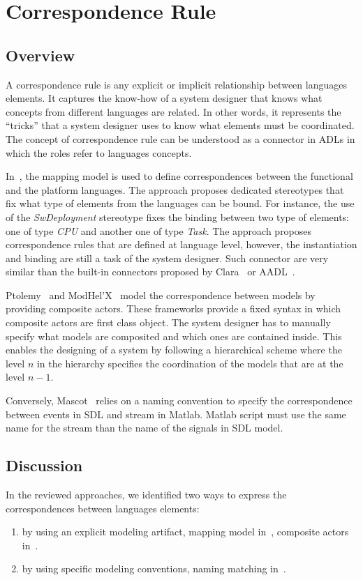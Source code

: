 \section{Correspondence Rule}
	\subsection{Overview}
A correspondence rule is any explicit or implicit relationship between languages elements. It captures the know-how of a system designer that knows what concepts from different languages are related. In other words, it represents the ``tricks'' that a system designer uses to know what elements must be coordinated. The concept of correspondence rule can be understood as a connector in ADLs in which the roles refer to languages concepts.  

In~\cite{dinatale}, the mapping model is used to define correspondences between the functional and the platform languages. The approach proposes dedicated stereotypes that fix what type of elements from the languages can be bound. For instance, the use of the \emph{SwDeployment} stereotype fixes the binding between two type of elements: one of type \emph{CPU} and another one of type \emph{Task}. The approach proposes correspondence rules that are defined at language level, however, the instantiation and binding are still a task of the system designer. Such connector are very similar than the built-in connectors proposed by Clara~\cite{clarabib} or AADL~\cite{aadlbib}. 
		
Ptolemy~\cite{ptoleframebib} and ModHel'X~\cite{modhelxbib} model the correspondence between models by providing composite actors. These frameworks provide a fixed syntax in which composite actors are first class object. The system designer has to manually specify what models are composited and which ones are contained inside. This enables the designing of a system by following a hierarchical scheme where the level $n$ in the hierarchy specifies the coordination of the models that are at the level $n-1$.

Conversely, Mascot~\cite{mascotbib} relies on a naming convention to specify the correspondence between events in SDL and stream in Matlab. Matlab script must use the same name for the stream than the name of the signals in SDL model.  

\subsection{Discussion}
In the reviewed approaches, we identified two ways to express the correspondences between languages elements:
\begin{enumerate}
 \item by using an explicit modeling artifact, \eg mapping model in~\cite{dinatale}, composite actors in~\cite{modhelxbib, ptoleframebib}. 	
  \item by using specific modeling conventions, \eg naming matching in~\cite{mascotbib}.
\end{enumerate}
				
